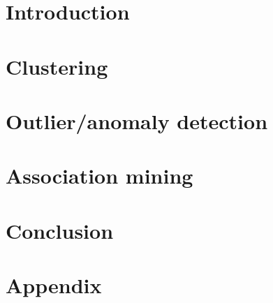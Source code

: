 \documentclass{article}
\begin{document}





\setcounter{tocdepth}{2}
\tableofcontents
{}

\newpage
{}
\section{Introduction}


\section{Clustering}





\section{Outlier/anomaly detection}


\section{Association mining}


\section{Conclusion}


\newpage



\section*{Appendix}
{}

\end{document}
